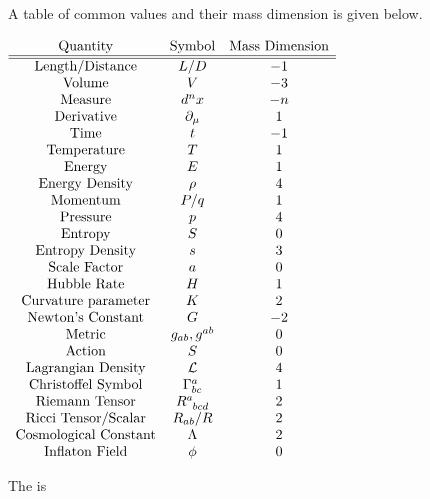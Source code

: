 \documentclass{article}
\begin{document}
\begin{fact}
A table of common values and their mass dimension is given below. 
\begin{center}$
\begin{array}{ccc}
    \text{Quantity} & \text{Symbol} & \text{Mass Dimension} \\
    \hline
    \hline
    \text{Length/Distance} & L/D & -1 \\
    \text{Volume} & V & -3 \\
    \text{Measure} & d^n x & -n \\
    \text{Derivative} & \del_\mu & 1 \\
    \text{Time} & t & -1 \\
    \text{Temperature} & T & 1 \\
    \text{Energy} & E & 1 \\
    \text{Energy Density} & \rho & 4 \\
    \text{Momentum} & P/q & 1 \\
    \text{Pressure} & p & 4 \\
    \text{Entropy} & S & 0 \\
    \text{Entropy Density} & s & 3 \\
    \text{Scale Factor} & a & 0 \\
    \text{Hubble Rate} & H & 1 \\
    \text{Curvature parameter} & K & 2 \\
    \text{Newton's Constant} & G & -2 \\
    \text{Metric} & g_{ab},g^{ab} & 0 \\
    \text{Action} & S & 0 \\
    \text{Lagrangian Density} & \mc{L} & 4 \\
    \text{Christoffel Symbol} & \Gamma^a_{bc} & 1 \\
    \text{Riemann Tensor} & R\indices{^a_b_c_d} & 2 \\
    \text{Ricci Tensor/Scalar} & R_{ab} / R & 2 \\
    \text{Cosmological Constant} & \Lambda & 2 \\
    \text{Inflaton Field} & \phi & 0 
\end{array}
$\end{center}
\end{fact}

\begin{definition}
The  is 
\end{definition}
\end{document}
